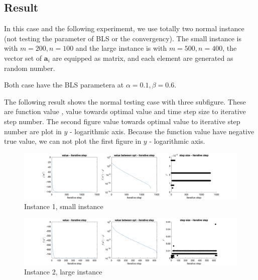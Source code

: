 \documentclass[]{article}
\begin{document}
\subsection{Result}
In this case and the following experimemt, we use totally two normal instance (not testing the parameter of BLS or the convergency). The small instance is with $m=200, n=100$ and the large instance is with $m=500,n=400$, the vector set of $\mathbf{a}_i$ are equipped as matrix, and each element are generated as random number.
\par Both case have the BLS parametera at $\alpha = 0.1, \beta = 0.6$.
\par The following result shows the normal testing case with three subfigure. These are function value , value towards optimal value and time step size to iterative step number. The second figure value towards optimal value to iterative step number are plot in $y$  - logarithmic axis. \color{blue} Because the function value have negative true value, we can not plot the first figure in $y$  - logarithmic axis.
\color {black}

\begin{figure}[H]
	\centering
	\includegraphics[width=350pt,keepaspectratio]{Gra_small_normal}
	\caption{Instance 1, small instance}
\end{figure}

\begin{figure}[H]
	\centering
	\includegraphics[width=350pt,keepaspectratio]{Gra_large_norm}
	\caption{Instance 2, large instance}
\end{figure}
\end{document}
